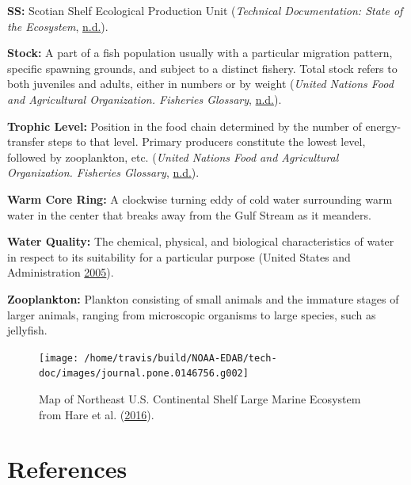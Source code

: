\documentclass[
]{book}
\begin{document}
\textbf{SS:}
Scotian Shelf Ecological Production Unit (\emph{Technical Documentation: State of the Ecosystem}, \protect\hyperlink{ref-techdoc}{n.d.}).

\textbf{Stock:}
A part of a fish population usually with a particular migration pattern, specific spawning grounds, and subject to a distinct fishery. Total stock refers to both juveniles and adults, either in numbers or by weight (\emph{United Nations Food and Agricultural Organization. Fisheries Glossary}, \protect\hyperlink{ref-unfao}{n.d.}).

\textbf{Trophic Level:}
Position in the food chain determined by the number of energy-transfer steps to that level. Primary producers constitute the lowest level, followed by zooplankton, etc. (\emph{United Nations Food and Agricultural Organization. Fisheries Glossary}, \protect\hyperlink{ref-unfao}{n.d.}).

\textbf{Warm Core Ring:}
A clockwise turning eddy of cold water surrounding warm water in the center that breaks away from the Gulf Stream as it meanders.

\textbf{Water Quality:}
The chemical, physical, and biological characteristics of water in respect to its suitability for a particular purpose (United States and Administration \protect\hyperlink{ref-noaaglos}{2005}).

\textbf{Zooplankton:}
Plankton consisting of small animals and the immature stages of larger animals, ranging from microscopic organisms to large species, such as jellyfish.



\begin{figure}

{\centering \texttt{[image: /home/travis/build/NOAA-EDAB/tech-doc/images/journal.pone.0146756.g002]} 

}

\caption{Map of Northeast U.S. Continental Shelf Large Marine Ecosystem from Hare et al. (\protect\hyperlink{ref-Hare2016}{2016}).}\label{fig:neusmap1}
\end{figure}

\hypertarget{references}{%
\chapter*{References}\label{references}}
\end{document}
